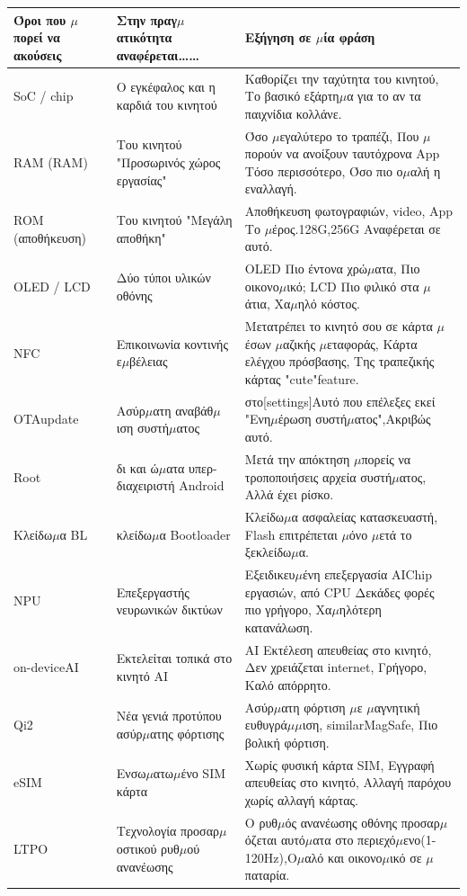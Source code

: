 
\begin{center}
\begin{tabularx}{\linewidth}{|X|X|X|}
\hline
\textbf{Όροι που $\mu$πορεί να ακούσεις} & \textbf{Στην πραγ$\mu$ατικότητα αναφέρεται……} & \textbf{Εξήγηση σε $\mu$ία φράση} \tabularnewline
\hline
SoC / chip & Ο εγκέφαλος και η καρδιά του κινητού & Καθορίζει την ταχύτητα του κινητού, Το βασικό εξάρτη$\mu$α για το αν τα παιχνίδια κολλάνε. \tabularnewline
RAM (RAM) & Του κινητού "Προσωρινός χώρος εργασίας" & Όσο $\mu$εγαλύτερο το τραπέζι, Που $\mu$πορούν να ανοίξουν ταυτόχρονα App Τόσο περισσότερο, Όσο πιο ο$\mu$αλή η εναλλαγή. \tabularnewline
ROM (αποθήκευση) & Του κινητού "Μεγάλη αποθήκη" & Αποθήκευση φωτογραφιών, video, App Το $\mu$έρος.128G,256G Αναφέρεται σε αυτό. \tabularnewline
OLED / LCD & Δύο τύποι υλικών οθόνης & OLED Πιο έντονα χρώ$\mu$ατα, Πιο οικονο$\mu$ικό; LCD Πιο φιλικό στα $\mu$άτια, Χα$\mu$ηλό κόστος. \tabularnewline
NFC & Επικοινωνία κοντινής ε$\mu$βέλειας & Μετατρέπει το κινητό σου σε κάρτα $\mu$έσων $\mu$αζικής $\mu$εταφοράς, Κάρτα ελέγχου πρόσβασης, Της τραπεζικής κάρτας "cute"feature. \tabularnewline
OTAupdate & Ασύρ$\mu$ατη αναβάθ$\mu$ιση συστή$\mu$ατος & στο[settings]Αυτό που επέλεξες εκεί "Ενη$\mu$έρωση συστή$\mu$ατος",Ακριβώς αυτό. \tabularnewline
Root & δι και ώ$\mu$ατα υπερ-διαχειριστή Android & Μετά την απόκτηση $\mu$πορείς να τροποποιήσεις αρχεία συστή$\mu$ατος, Αλλά έχει ρίσκο. \tabularnewline
Κλείδω$\mu$α BL & κλείδω$\mu$α Bootloader & Κλείδω$\mu$α ασφαλείας κατασκευαστή, Flash επιτρέπεται $\mu$όνο $\mu$ετά το ξεκλείδω$\mu$α. \tabularnewline
NPU & Επεξεργαστής νευρωνικών δικτύων & Εξειδικευ$\mu$ένη επεξεργασία AIChip εργασιών, από CPU Δεκάδες φορές πιο γρήγορο, Χα$\mu$ηλότερη κατανάλωση. \tabularnewline
on-deviceAI & Εκτελείται τοπικά στο κινητό AI & AI Εκτέλεση απευθείας στο κινητό, Δεν χρειάζεται internet, Γρήγορο, Καλό απόρρητο. \tabularnewline
Qi2 & Νέα γενιά προτύπου ασύρ$\mu$ατης φόρτισης & Ασύρ$\mu$ατη φόρτιση $\mu$ε $\mu$αγνητική ευθυγρά$\mu$$\mu$ιση, similarMagSafe, Πιο βολική φόρτιση. \tabularnewline
eSIM & Ενσω$\mu$ατω$\mu$ένο SIM κάρτα & Χωρίς φυσική κάρτα SIM, Εγγραφή απευθείας στο κινητό, Αλλαγή παρόχου χωρίς αλλαγή κάρτας. \tabularnewline
LTPO & Τεχνολογία προσαρ$\mu$οστικού ρυθ$\mu$ού ανανέωσης & Ο ρυθ$\mu$ός ανανέωσης οθόνης προσαρ$\mu$όζεται αυτό$\mu$ατα στο περιεχό$\mu$ενο(1-120Hz),Ο$\mu$αλό και οικονο$\mu$ικό σε $\mu$παταρία. \tabularnewline
\hline
\end{tabularx}
\end{center}

